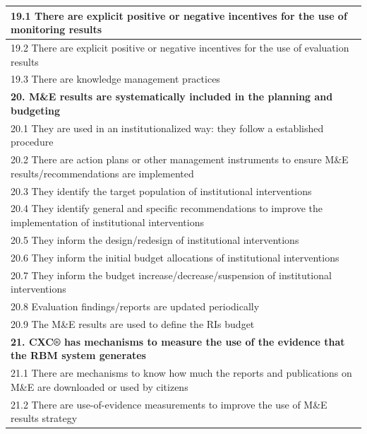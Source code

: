\documentclass[
  10pt,
]{book}
\begin{document}
\begin{table}
\begin{tabular}[t]{l}
\hline
\hspace{1em}19.1 There are explicit positive or negative incentives for the use of monitoring results\\
\hline
\hspace{1em}19.2 There are explicit positive or negative incentives for the use of evaluation results\\
\hline
\hspace{1em}19.3 There are knowledge management practices\\
\hline
\multicolumn{1}{l}{\textbf{20. M\&E results are systematically included in the planning and budgeting}}\\
\hline
\hspace{1em}\hspace{1em}20.1 They are used in an institutionalized way: they follow a established procedure\\
\hline
\hspace{1em}\hspace{1em}20.2 There are action plans or other management instruments to ensure M\&E results/recommendations are implemented\\
\hline
\hspace{1em}\hspace{1em}20.3 They identify the target population of institutional interventions\\
\hline
\hspace{1em}\hspace{1em}20.4 They identify general and specific recommendations to improve the implementation of institutional interventions\\
\hline
\hspace{1em}\hspace{1em}20.5 They inform the design/redesign of institutional interventions\\
\hline
\hspace{1em}\hspace{1em}20.6 They inform the initial budget allocations of institutional interventions\\
\hline
\hspace{1em}20.7 They inform the budget increase/decrease/suspension of institutional interventions\\
\hline
\hspace{1em}20.8 Evaluation findings/reports are updated periodically\\
\hline
20.9 The M\&E results are used to define the RIs budget\\
\hline
\multicolumn{1}{l}{\textbf{21. CXC® has mechanisms to measure the use of the evidence that the RBM system generates}}\\
\hline
\hspace{1em}21.1 There are mechanisms to know how much the reports and publications on M\&E are downloaded or used by citizens\\
\hline
\hspace{1em}21.2 There are use-of-evidence measurements to improve the use of M\&E results strategy\\
\hline
\end{tabular}
\end{table}
\end{document}
